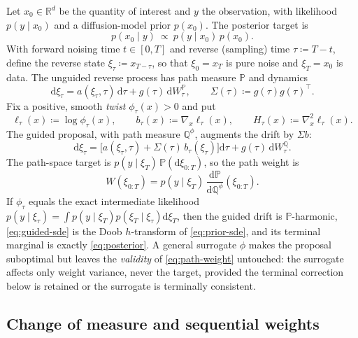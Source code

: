 \documentclass[11pt]{article}
\newcommand{\bbP}{\mathbb{P}}
\newcommand{\bbQ}{\mathbb{Q}}
\newcommand{\R}{\mathbb{R}}
\newcommand{\dd}{\mathrm{d}}
\begin{document}
Let $x_0\in\R^d$ be the quantity of interest and $y$ the observation, with likelihood $p(y\mid x_0)$
and a diffusion-model prior $p(x_0)$. The posterior target is
\begin{equation}\label{eq:posterior}
  p(x_0\mid y)\ \propto\ p(y\mid x_0)\,p(x_0).
\end{equation}
With forward noising time $t\in[0,T]$ and reverse (sampling) time $\tau\coloneqq T-t$, define the
reverse state $\xi_\tau\coloneqq x_{T-\tau}$, so that $\xi_0=x_T$ is pure noise and $\xi_T=x_0$ is
data. The unguided reverse process has path measure $\bbP$ and dynamics
\begin{equation}\label{eq:prior-sde}
  \dd\xi_\tau = a(\xi_\tau,\tau)\,\dd\tau + g(\tau)\,\dd W^{\bbP}_\tau,
  \qquad \Sigma(\tau)\coloneqq g(\tau)g(\tau)^\top .
\end{equation}
Fix a positive, smooth \emph{twist} $\phi_\tau(x)>0$ and put
\begin{equation}\label{eq:twist}
  \ell_\tau(x)\coloneqq\log\phi_\tau(x),
  \qquad b_\tau(x)\coloneqq\nabla_x\ell_\tau(x),
  \qquad H_\tau(x)\coloneqq\nabla_x^2\ell_\tau(x).
\end{equation}
The guided proposal, with path measure $\bbQ^\phi$, augments the drift by $\Sigma b$:
\begin{equation}\label{eq:guided-sde}
  \dd\xi_\tau = \bigl[a(\xi_\tau,\tau)+\Sigma(\tau)\,b_\tau(\xi_\tau)\bigr]\dd\tau
  + g(\tau)\,\dd W^{\bbQ}_\tau .
\end{equation}
The path-space target is $p(y\mid\xi_T)\,\bbP(\dd\xi_{0:T})$, so the path weight is
\begin{equation}\label{eq:path-weight}
  W(\xi_{0:T}) = p(y\mid\xi_T)\,\frac{\dd\bbP}{\dd\bbQ^\phi}(\xi_{0:T}).
\end{equation}
If $\phi_\tau$ equals the exact intermediate likelihood
$p(y\mid\xi_\tau)=\int p(y\mid\xi_T)p(\xi_T\mid\xi_\tau)\dd\xi_T$, then the guided drift is
$\bbP$-harmonic, \eqref{eq:guided-sde} is the Doob $h$-transform of \eqref{eq:prior-sde}, and its
terminal marginal is exactly \eqref{eq:posterior}. A general surrogate $\phi$ makes the proposal
suboptimal but leaves the \emph{validity} of \eqref{eq:path-weight} untouched: the surrogate affects
only weight variance, never the target, provided the terminal correction below is retained or the
surrogate is terminally consistent.

\subsection{Change of measure and sequential weights}
\end{document}
